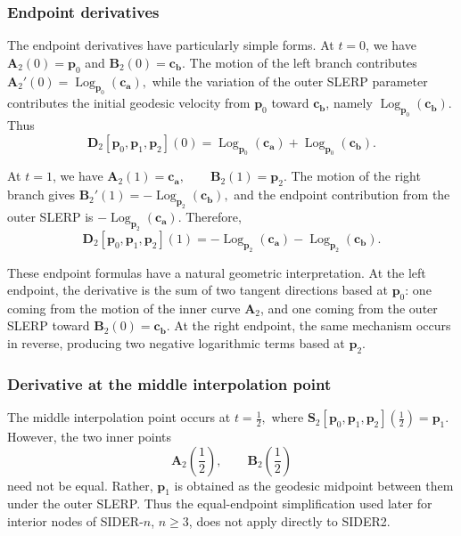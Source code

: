 \documentclass[a4paper,11pt]{article}
\newcommand{\bp}{\mathbf{p}}
\newcommand{\ba}{\mathbf{a}}
\newcommand{\bb}{\mathbf{b}}
\newcommand{\bc}{\mathbf{c}}
\newcommand{\bA}{\mathbf{A}}
\newcommand{\bB}{\mathbf{B}}
\newcommand{\bD}{\mathbf{D}}
\newcommand{\Log}{\operatorname{Log}}
\numberwithin{equation}{section}
\theoremstyle{plain}
\theoremstyle{definition}
\theoremstyle{remark}
\begin{document}
\subsubsection{Endpoint derivatives}

The endpoint derivatives have particularly simple forms.  At \(t=0\), we have \(\bA_2(0)=\bp_0\) and \(\bB_2(0)=\bc_\bb\).
The motion of the left branch contributes
\(\bA_2'(0)=\Log_{\bp_0}(\bc_\ba),\)
while the variation of the outer SLERP parameter contributes the initial geodesic velocity from $\bp_0$ toward $\bc_\bb$, namely
\(\Log_{\bp_0}(\bc_\bb).\)
Thus
\[
\boxed{
        \bD_2[\bp_0,\bp_1,\bp_2](0)
        =
        \Log_{\bp_0}(\bc_\ba)
        +
        \Log_{\bp_0}(\bc_\bb).
}
\]

At $t=1$, we have
\(\bA_2(1)=\bc_\ba, \qquad \bB_2(1)=\bp_2.\)
The motion of the right branch gives
\(\bB_2'(1)=-\Log_{\bp_2}(\bc_\bb),\)
and the endpoint contribution from the outer SLERP is
\(-\Log_{\bp_2}(\bc_\ba).\)
Therefore,
\[
\boxed{
        \bD_2[\bp_0,\bp_1,\bp_2](1)
        =
        -\Log_{\bp_2}(\bc_\ba)
        -
        \Log_{\bp_2}(\bc_\bb).
}
\]

These endpoint formulas have a natural geometric interpretation.  At the left endpoint, the derivative is the sum of two tangent directions based at $\bp_0$: one coming from the motion of the inner curve $\bA_2$, and one coming from the outer SLERP toward $\bB_2(0)=\bc_\bb$.  At the right endpoint, the same mechanism occurs in reverse, producing two negative logarithmic terms based at $\bp_2$.

\subsubsection{Derivative at the middle interpolation point}

The middle interpolation point occurs at
\(t=\frac12,\)
where
\(\mathbf{S}_2[\bp_0,\bp_1,\bp_2]\!\left(\frac12\right)=\bp_1.\)
However, the two inner points
\[
        \bA_2\!\left(\frac12\right),
        \qquad
        \bB_2\!\left(\frac12\right)
\]
need not be equal.  Rather, $\bp_1$ is obtained as the geodesic midpoint between them under the outer SLERP.  Thus the equal-endpoint simplification used later for interior nodes of SIDER-$n$, $n\geq 3$, does not apply directly to SIDER2.
\end{document}
